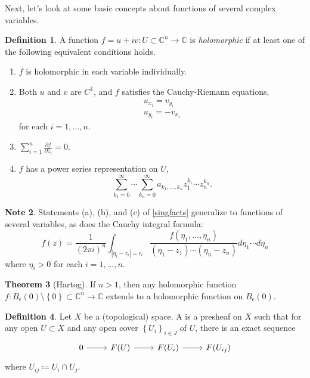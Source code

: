 \documentclass[10pt,letterpaper,cm]{nupset}
\theoremstyle{definition}
\newtheorem{defn}{Definition}[subsection]
\newtheorem{note}[defn]{Note}
\theoremstyle{theorem}
\newtheorem{theorem}[defn]{Theorem}
\theoremstyle{remark}
\newcommand{\C}{\mathbb C}
\newcommand{\1}{\mathbb{1}}
\newcommand{\0}{\vec 0}
\newcommand{\be}{\begin{enumerate}}
\newcommand{\ee}{\end{enumerate}}
\begin{document}
\medskip

Next, let's look at some basic concepts about functions of several complex variables.

\begin{defn}
A function $f = u +iv: U\subset \C^n \to \C$ is \textit{holomorphic} if at least one of  the following equivalent conditions holds.
\be[label=(\roman*)]
\item $f$ is holomorphic in each variable individually.
\item  Both $u$ and $v$ are $C^1$, and $f$ satisfies the Cauchy-Riemann equations,
\begin{gather*}
u_{x_i}  = v_{y_i}
\\ u_{y_i}  = {-v_{x_i}}
\end{gather*}
for each $i=1, \ldots, n$.
\item $\sum_{i=1}^n\frac{\partial{f}}{\partial{\bar{z}_i}} =0$.
\item $f$ has a power series representation on $U$,
\[
\sum_{k_1=0}^{\infty}\cdots \sum_{k_n=0}^{\infty} a_{k_1, \ldots, k_n}z_1^{k_1}\cdots z_n^{k_n}.
\]
\ee
\end{defn}

\begin{note}
Statements (a), (b), and (c) of \cref{singfacts} generalize to functions of several variables, as does the Cauchy integral formula:
\[
f(z) = \frac{1}{(2\pi i)^n} \int_{\left\lvert{\eta_i - z_i}\right\rvert = \epsilon_i} \frac{f(\eta_1, \ldots, \eta_n)}{\left(\eta_1 - z_1\right)\cdots \left(\eta_n - z_n\right)}d{\eta_1}\cdots d{\eta_n}
\] where $\eta_i >0$ for each $i=1, \ldots, n$.
\end{note}

\begin{theorem}[Hartog]
If $n>1$, then any holomorphic function $f: B_{\epsilon}(0)\setminus \left\{0\right\} \subset \C^n \to \C$ extends to a holomorphic function on $B_{\epsilon}(0)$.
\end{theorem}

\begin{defn} Let $X$ be a (topological) space. A  is a presheaf on $X$ such that for any open $U\subset X$ and any open cover $\left\{U_i\right\}_{i\in J}$ of $U$, there is an exact sequence
\[
\begin{tikzcd}
0 \arrow[r] & F(U) \arrow[r] & F(U_i) \arrow[r] & F(U_{ij})
\end{tikzcd}
\] where $U_{ij} \coloneqq U_i \cap U_j$.
\end{defn}
\end{document}
